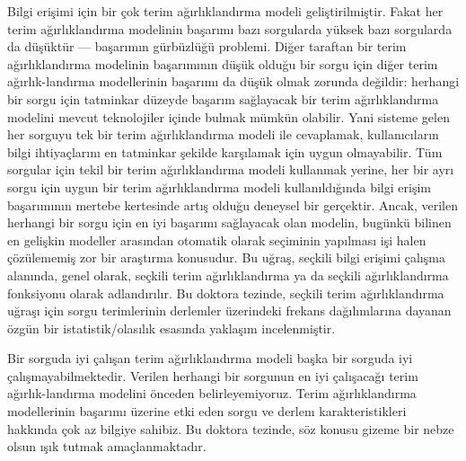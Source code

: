 \begin{spacing}{1.1}
Bilgi eri\c{s}imi i\c{c}in bir \c{c}ok terim a\u{g}{\i}rl{\i}kland{\i}rma modeli geli\c{s}tirilmi\c{s}tir. 
Fakat her terim a\u{g}{\i}rl{\i}kland{\i}rma modelinin ba\c{s}ar{\i}m{\i} baz{\i} sorgularda y\"{u}ksek baz{\i} sorgularda da d\"{u}\c{s}\"{u}kt\"{u}r --- ba\c{s}ar{\i}m{\i}n g\"{u}rb\"{u}zl\"{u}\u{g}\"{u} problemi. 
Di\u{g}er taraftan bir terim a\u{g}{\i}rl{\i}kland{\i}rma modelinin ba\c{s}ar{\i}m{\i}n{\i}n d\"{u}\c{s}\"{u}k oldu\u{g}u bir sorgu i\c{c}in di\u{g}er terim a\u{g}{\i}rl{\i}k-land{\i}rma modellerinin ba\c{s}ar{\i}m{\i} da d\"{u}\c{s}\"{u}k olmak zorunda de\u{g}ildir: herhangi bir sorgu i\c{c}in tatminkar d\"{u}zeyde ba\c{s}ar{\i}m sa\u{g}layacak bir terim a\u{g}{\i}rl{\i}kland{\i}rma modelini mevcut teknolojiler i\c{c}inde bulmak m\"{u}mk\"{u}n olabilir. Yani sisteme gelen her sorguyu tek bir terim a\u{g}{\i}rl{\i}kland{\i}rma modeli ile cevaplamak, kullan{\i}c{\i}lar{\i}n bilgi ihtiya\c{c}lar{\i}n{\i} en tatminkar \c{s}ekilde kar\c{s}{\i}lamak i\c{c}in uygun olmayabilir. T\"{u}m sorgular i\c{c}in tekil bir terim a\u{g}{\i}rl{\i}kland{\i}rma modeli kullanmak yerine, her bir ayr{\i} sorgu i\c{c}in uygun bir terim a\u{g}{\i}rl{\i}kland{\i}rma modeli kullan{\i}ld{\i}\u{g}{\i}nda bilgi eri\c{s}im ba\c{s}ar{\i}m{\i}n{\i}n mertebe kertesinde art{\i}\c{s} oldu\u{g}u deneysel bir ger\c{c}ektir. Ancak, verilen herhangi bir sorgu i\c{c}in en iyi ba\c{s}ar{\i}m{\i} sa\u{g}layacak olan modelin, bug\"{u}nk\"{u} bilinen en geli\c{s}kin modeller aras{\i}ndan otomatik olarak se\c{c}iminin yap{\i}lmas{\i} i\c{s}i halen \c{c}\"{o}z\"{u}lememi\c{s} zor bir ara\c{s}t{\i}rma konusudur. Bu u\u{g}ra\c{s}, se\c{c}kili bilgi eri\c{s}imi \c{c}al{\i}\c{s}ma alan{\i}nda, genel olarak, se\c{c}kili terim a\u{g}{\i}rl{\i}kland{\i}rma ya da se\c{c}kili a\u{g}{\i}rl{\i}kland{\i}rma fonksiyonu olarak adland{\i}r{\i}l{\i}r. Bu doktora tezinde, se\c{c}kili terim a\u{g}{\i}rl{\i}kland{\i}rma u\u{g}ra\c{s}{\i} i\c{c}in sorgu terimlerinin derlemler \"{u}zerindeki frekans da\u{g}{\i}l{\i}mlar{\i}na dayanan \"{o}zg\"{u}n bir istatistik/olas{\i}l{\i}k esas{\i}nda yakla\c{s}{\i}m incelenmi\c{s}tir.

Bir sorguda iyi \c{c}al{\i}\c{s}an terim a\u{g}{\i}rl{\i}kland{\i}rma modeli ba\c{s}ka bir sorguda iyi \c{c}al{\i}\c{s}mayabilmektedir. 
Verilen herhangi bir sorgunun en iyi \c{c}al{\i}\c{s}aca\u{g}{\i} terim a\u{g}{\i}rl{\i}k-land{\i}rma modelini \"{o}nceden belirleyemiyoruz. 
Terim a\u{g}{\i}rl{\i}kland{\i}rma modellerinin ba\c{s}ar{\i}m{\i} \"{u}zerine etki eden sorgu ve derlem karakteristikleri hakk{\i}nda \c{c}ok az bilgiye sahibiz. 
Bu doktora tezinde, s\"{o}z konusu gizeme bir nebze olsun {\i}\c{s}{\i}k tutmak ama\c{c}lanmaktad{\i}r.


\end{spacing}
